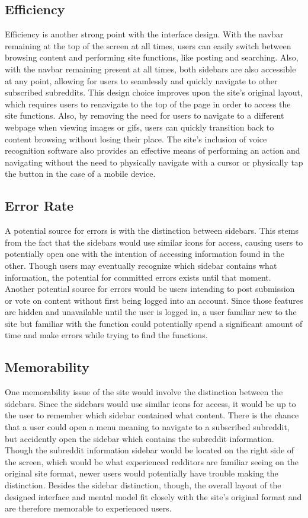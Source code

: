 \documentclass{article}
\begin{document}
\subsection{Efficiency} Efficiency is another strong point with the interface design. With the navbar remaining at the top of the screen at all times, users can easily switch between browsing content and performing site functions, like posting and searching. Also, with the navbar remaining present at all times, both sidebars are also accessible at any point, allowing for users to seamlessly and quickly navigate to other subscribed subreddits. This design choice improves upon the site's original layout, which requires users to renavigate to the top of the page in order to access the site functions. Also, by removing the need for users to navigate to a different webpage when viewing images or gifs, users can quickly transition back to content browsing without losing their place. The site's inclusion of voice recognition software also provides an effective means of performing an action and navigating without the need to physically navigate with a cursor or physically tap the button in the case of a mobile device.

\subsection{Error Rate} A potential source for errors is with the distinction between sidebars. This stems from the fact that the sidebars would use similar icons for access, causing users to potentially open one with the intention of accessing information found in the other. Though users may eventually recognize which sidebar contains what information, the potential for committed errors exists until that moment. Another potential source for errors would be users intending to post submission or vote on content without first being logged into an account. Since those features are hidden and unavailable until the user is logged in, a user familiar new to the site but familiar with the function could potentially spend a significant amount of time and make errors while trying to find the functions.

\subsection{Memorability} One memorability issue of the site would involve the distinction between the sidebars. Since the sidebars would use similar icons for access, it would be up to the user to remember which sidebar contained what content. There is the chance that a user could open a menu meaning to navigate to a subscribed subreddit, but accidently open the sidebar which contains the subreddit information. Though the subreddit information sidebar would be located on the right side of the screen, which would be what experienced redditors are familiar seeing on the original site format, newer users would potentially have trouble making the distinction. Besides the sidebar distinction, though, the overall layout of the designed interface and mental model fit closely with the site's original format and are therefore memorable to experienced users.
\end{document}
